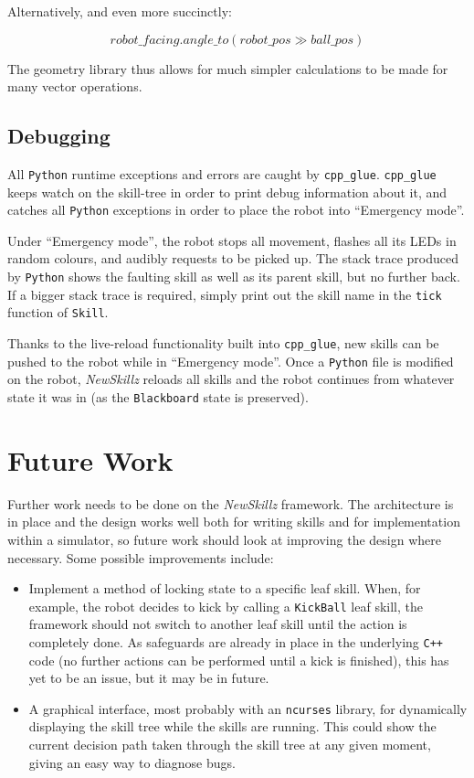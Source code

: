 Alternatively, and even more succinctly:

\begin{equation}
robot\_facing.angle\_to(robot\_pos \gg ball\_pos)
\end{equation}

The geometry library thus allows for much simpler calculations to be made for many vector operations.

\subsection{Debugging} 

All \verb!Python! runtime exceptions and errors are caught by \texttt{cpp\_glue}. \texttt{cpp\_glue} keeps watch on the skill-tree in order to print debug information about it, and catches all \verb!Python! exceptions in order to place the robot into ``Emergency mode''.

Under ``Emergency mode'', the robot stops all movement, flashes all its LEDs in random colours, and audibly requests to be picked up. The stack trace produced by \verb!Python! shows the faulting skill as well as its parent skill, but no further back. If a bigger stack trace is required, simply print out the skill name in the \texttt{tick} function of \texttt{Skill}.

Thanks to the live-reload functionality built into \texttt{cpp\_glue}, new skills can be pushed to the robot while in ``Emergency mode''. Once a \verb!Python! file is modified on the robot, \textit{NewSkillz} reloads all skills and the robot continues from whatever state it was in (as the \texttt{Blackboard} state is preserved).

\section{Future Work}

Further work needs to be done on the \textit{NewSkillz} framework. The architecture is in place and the design works well both for writing skills and for implementation within a simulator, so future work should look at improving the design where necessary. Some possible improvements include:
\begin{itemize}
\item Implement a method of locking state to a specific leaf skill. When, for example, the robot decides to kick by calling a \texttt{KickBall} leaf skill, the framework should not switch to another leaf skill until the action is completely done. As safeguards are already in place in the underlying \verb!C++! code (no further actions can be performed until a kick is finished), this has yet to be an issue, but it may be in future.
\item A graphical interface, most probably with an \texttt{ncurses} library, for dynamically displaying the skill tree while the skills are running. This could show the current decision path taken through the skill tree at any given moment, giving an easy way to diagnose bugs.
\end{itemize}

